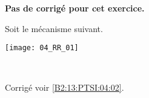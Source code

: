 \normaltrue
\correctionfalse


\setcounter{numques}{0}
\ifcorrection
\else
\textbf{Pas de corrigé pour cet exercice.}
\fi

\ifprof
\else
Soit le mécanisme suivant. 
\begin{center}
\texttt{[image: 04\_RR\_01]}
\end{center}
\fi

\ifprof ~\\
\else

\fi



\ifprof
\else
\footnotesize

\normalsize
\begin{flushright}
\footnotesize{Corrigé  voir \ref{B2:13:PTSI:04:02}.}
\end{flushright}%
\fi